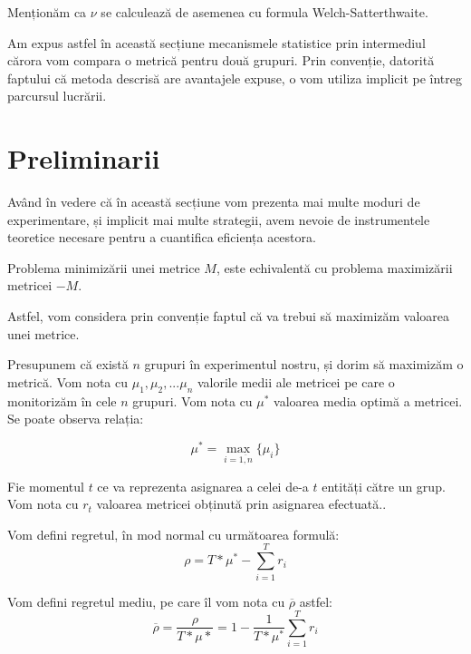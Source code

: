 \vspace{0.8cm}

Menționăm ca $\nu$ se calculează de asemenea cu formula Welch-Satterthwaite.

Am expus astfel în această secțiune mecanismele statistice prin intermediul cărora vom compara o metrică pentru două grupuri. Prin convenție, datorită faptului că metoda descrisă are avantajele expuse, o vom utiliza implicit pe întreg parcursul lucrării.

\section{Preliminarii}

Având în vedere că în această secțiune vom prezenta mai multe moduri de experimentare, și implicit mai multe strategii, avem nevoie de instrumentele teoretice necesare pentru a cuantifica eficiența acestora.

\begin{remark}
	Problema minimizării unei metrice $M$, este echivalentă cu problema maximizării metricei $-M$.
\end{remark}

Astfel, vom considera prin convenție faptul că va trebui să maximizăm valoarea unei metrice.


Presupunem că există $n$ grupuri în experimentul nostru, și dorim să maximizăm o metrică. Vom nota cu $\mu_1, \mu_2, ... \mu_n$ valorile medii ale metricei pe care o monitorizăm în cele $n$ grupuri. Vom nota cu $\mu^*$ valoarea media optimă a metricei. Se poate observa relația:

\[
\mu^* = \max_{i = \overline{1, n}}\{\mu_i\}
\]

Fie momentul $t$ ce va reprezenta asignarea a celei de-a $t$ entități către un grup. Vom nota cu $r_t$ valoarea metricei obținută prin asignarea efectuată..

\begin{definition}
\label{regret}
Vom defini regretul, în mod normal cu următoarea formulă: 
\[
\rho = T * \mu^* - \sum_{i = 1}^{T}{r_i}
\]
\end{definition}

\begin{definition}
\label{regretaverage}
	Vom defini regretul mediu, pe care îl vom nota cu $\overline{\rho}$ astfel:
	\[
	\overline{\rho} = \frac{\rho}{T * \mu*} = 1 - \frac{1}{T * \mu^*}\sum_{i = 1}^{T}{r_i}
	\]
\end{definition}

